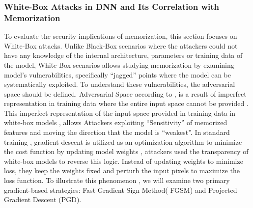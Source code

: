 \subsubsection{White-Box Attacks in DNN and Its Correlation with Memorization }
To evaluate the security implications of memorization, this section focuses on White-Box attacks. Unlike Black-Box scenarios where the attackers could not have any knowledge of the internal architecture, parameters or training data of the model, White-Box scenarios allows studying memorization by examining model’s vulnerabilities, specifically “jagged” points where the model can be systematically exploited. To understand these vulnerabilities, the adversarial space should be defined. Adversarial Space according to \cite{chio_clarence_9b691fc0}, is a result of imperfect representation in training data where the entire input space cannot be provided . This imperfect representation of the input space provided in training data in white-box models , allows Attackers exploiting “Sensitivity” of memorized features  and moving the direction that the model is “weakest”. In standard training , gradient-descent is utilized as an  optimization algorithm to minimize the cost function by updating model weights , attackers used the transparency of white-box models to reverse this logic. Instead of updating weights to minimize loss, they keep the weights fixed and perturb the input pixels to maximize the loss function. To illustrate this phenomenon , we will examine two primary gradient-based strategies: Fast Gradient Sign Method( FGSM) and Projected Gradient Descent (PGD).
